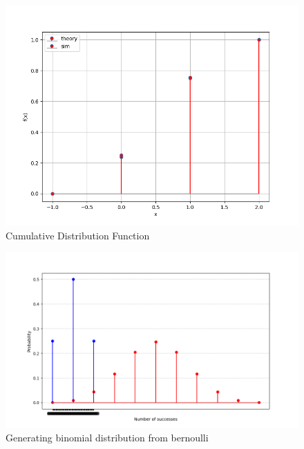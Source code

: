 \documentclass[journal]{IEEEtran}
\begin{document}
\begin{figure}[h!]
   \centering
   \includegraphics[width=0.7\columnwidth]{figs/fig2.png}
    \caption{Cumulative Distribution Function}
\end{figure}

\begin{figure}[h!]
   \centering
   \includegraphics[width=0.7\columnwidth]{figs/binomial.png}
    \caption{Generating binomial distribution from bernoulli}
\end{figure}
\end{document}
